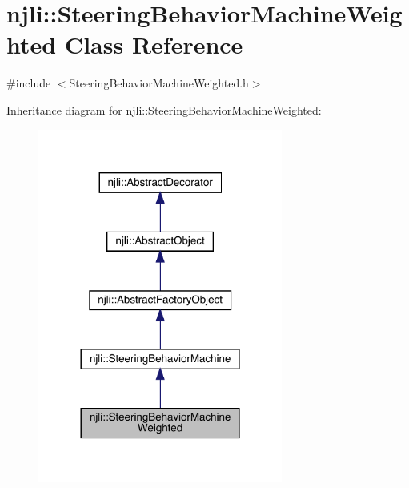 \hypertarget{classnjli_1_1_steering_behavior_machine_weighted}{}\section{njli\+:\+:Steering\+Behavior\+Machine\+Weighted Class Reference}
\label{classnjli_1_1_steering_behavior_machine_weighted}


{\ttfamily \#include $<$Steering\+Behavior\+Machine\+Weighted.\+h$>$}



Inheritance diagram for njli\+:\+:Steering\+Behavior\+Machine\+Weighted\+:\nopagebreak
\begin{figure}[H]
\begin{center}
\leavevmode
\includegraphics[width=228pt]{classnjli_1_1_steering_behavior_machine_weighted__inherit__graph}
\end{center}
\end{figure}


